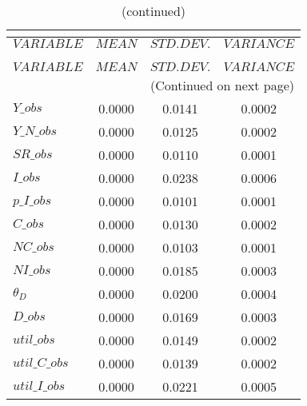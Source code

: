  
\begin{center}
\begin{longtable}{lccc} 
\caption{THEORETICAL MOMENTS}\\
 \label{Table:th_moments}\\
\toprule 
$VARIABLE      $	 & 	 $         MEAN$	 & 	 $    STD. DEV.$	 & 	 $     VARIANCE$\\
\midrule \endfirsthead 
\caption{(continued)}\\
 \toprule \\ 
$VARIABLE      $	 & 	 $         MEAN$	 & 	 $    STD. DEV.$	 & 	 $     VARIANCE$\\
\midrule \endhead 
\midrule \multicolumn{4}{r}{(Continued on next page)} \\ \bottomrule \endfoot 
\bottomrule \endlastfoot 
$Y\_obs        $	 & 	       0.0000	 & 	       0.0141	 & 	       0.0002 \\ 
$Y\_N\_obs     $	 & 	       0.0000	 & 	       0.0125	 & 	       0.0002 \\ 
$SR\_obs       $	 & 	       0.0000	 & 	       0.0110	 & 	       0.0001 \\ 
$I\_obs        $	 & 	       0.0000	 & 	       0.0238	 & 	       0.0006 \\ 
$p\_I\_obs     $	 & 	       0.0000	 & 	       0.0101	 & 	       0.0001 \\ 
$C\_obs        $	 & 	       0.0000	 & 	       0.0130	 & 	       0.0002 \\ 
$NC\_obs       $	 & 	       0.0000	 & 	       0.0103	 & 	       0.0001 \\ 
$NI\_obs       $	 & 	       0.0000	 & 	       0.0185	 & 	       0.0003 \\ 
${\theta_D}    $	 & 	       0.0000	 & 	       0.0200	 & 	       0.0004 \\ 
$D\_obs        $	 & 	       0.0000	 & 	       0.0169	 & 	       0.0003 \\ 
$util\_obs     $	 & 	       0.0000	 & 	       0.0149	 & 	       0.0002 \\ 
$util\_C\_obs  $	 & 	       0.0000	 & 	       0.0139	 & 	       0.0002 \\ 
$util\_I\_obs  $	 & 	       0.0000	 & 	       0.0221	 & 	       0.0005 \\ 
\end{longtable}
 \end{center}
